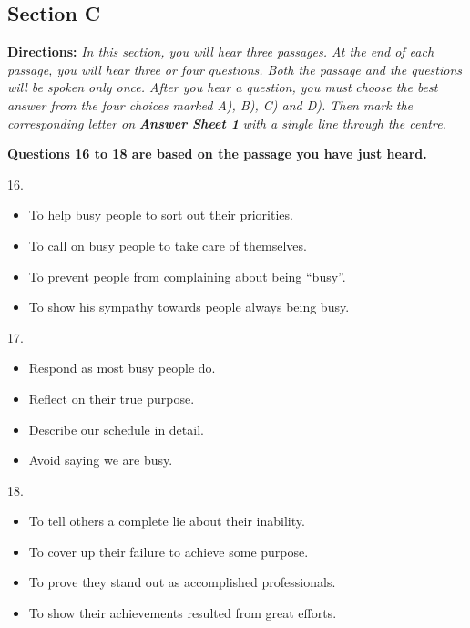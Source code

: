 \documentclass[UTF8,11pt]{ctexart}
\begin{document}
\subsection*{\textbf{Section C}}


\textbf{Directions:}\textit{ In this section, you will hear three passages. At the end of each passage, you will hear three or four} \textit{questions. Both the passage and the questions will be spoken only once. After you hear a question, you must} \textit{choose the best answer from the four choices marked A), B), C) and D). Then mark the corresponding letter on} \textbf{\textit{Answer Sheet 1}}\textit{ with a single line through the centre.}


\textbf{Questions 16 to 18 are based on the passage you have just heard.}


16.


\begin{itemize}[leftmargin=2em,itemsep=.2em,topsep=.4em]\item[A.] To help busy people to sort out their priorities.
\item[B.] To call on busy people to take care of themselves.
\item[C.] To prevent people from complaining about being “busy”.
\item[D.] To show his sympathy towards people always being busy.
\end{itemize}

17.


\begin{itemize}[leftmargin=2em,itemsep=.2em,topsep=.4em]\item[A.] Respond as most busy people do.
\item[B.] Reflect on their true purpose.
\item[C.] Describe our schedule in detail.
\item[D.] Avoid saying we are busy.
\end{itemize}

18.


\begin{itemize}[leftmargin=2em,itemsep=.2em,topsep=.4em]\item[A.] To tell others a complete lie about their inability.
\item[B.] To cover up their failure to achieve some purpose.
\item[C.] To prove they stand out as accomplished professionals.
\item[D.] To show their achievements resulted from great efforts.
\end{itemize}
\end{document}
